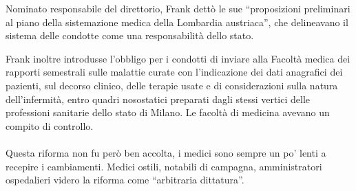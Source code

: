 Nominato responsabile del direttorio, Frank dettò le sue ``proposizioni
preliminari al piano della sistemazione medica della Lombardia
austriaca'', che delineavano il sistema delle condotte come una
responsabilità dello stato.

Frank inoltre introdusse l'obbligo per i condotti di inviare alla
Facoltà medica dei rapporti semestrali sulle malattie curate con
l'indicazione dei dati anagrafici dei pazienti, sul decorso clinico,
delle terapie usate e di considerazioni sulla natura dell'infermità,
entro quadri nosostatici preparati dagli stessi vertici delle
professioni sanitarie dello stato di Milano. Le facoltà di medicina
avevano un compito di controllo.
\\\\
Questa riforma non fu però ben accolta, i medici sono sempre un po'
lenti a recepire i cambiamenti. Medici ostili, notabili di campagna,
amministratori ospedalieri videro la riforma come ``arbitraria
dittatura''.


